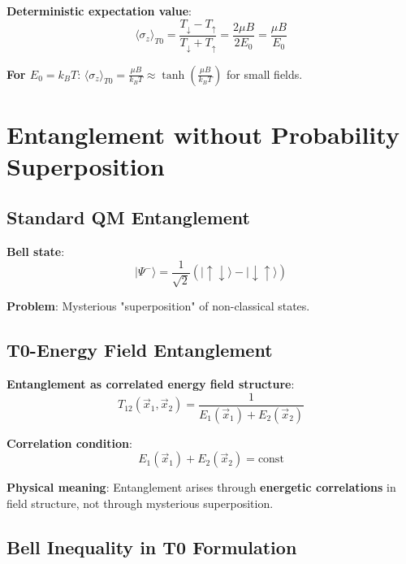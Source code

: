 \documentclass[12pt,a4paper]{article}
\newcommand{\psiket}[1]{|#1\rangle}
\begin{document}
	\textbf{Deterministic expectation value}:
	\begin{equation}
		\boxed{\langle \sigma_z \rangle_{T0} = \frac{T_{\downarrow} - T_{\uparrow}}{T_{\downarrow} + T_{\uparrow}} = \frac{2\mu B}{2E_0} = \frac{\mu B}{E_0}}
	\end{equation}
	
	\textbf{For $E_0 = k_B T$}: $\langle \sigma_z \rangle_{T0} = \frac{\mu B}{k_B T} \approx \tanh\left(\frac{\mu B}{k_B T}\right)$ for small fields.
	
	\section{Entanglement without Probability Superposition}
	
	\subsection{Standard QM Entanglement}
	
	\textbf{Bell state}:
	\begin{equation}
		\psiket{\Psi^-} = \frac{1}{\sqrt{2}}(\psiket{\uparrow\downarrow} - \psiket{\downarrow\uparrow})
	\end{equation}
	
	\textbf{Problem}: Mysterious "superposition" of non-classical states.
	
	\subsection{T0-Energy Field Entanglement}
	
	\textbf{Entanglement as correlated energy field structure}:
	\begin{equation}
		\boxed{T_{12}(\vec{x}_1, \vec{x}_2) = \frac{1}{E_1(\vec{x}_1) + E_2(\vec{x}_2)}}
	\end{equation}
	
	\textbf{Correlation condition}:
	\begin{equation}
		E_1(\vec{x}_1) + E_2(\vec{x}_2) = \text{const}
	\end{equation}
	
	\textbf{Physical meaning}: Entanglement arises through \textbf{energetic correlations} in field structure, not through mysterious superposition.
	
	\subsection{Bell Inequality in T0 Formulation}
	
\end{document}
